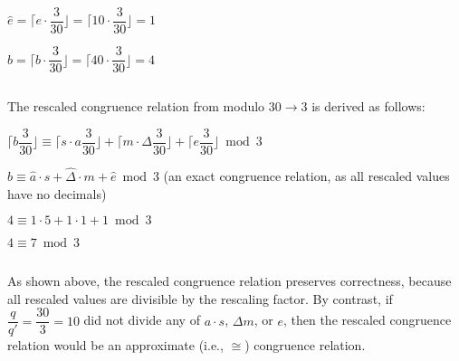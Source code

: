 $\hat{e} = \Bigg\lceil e\cdot\dfrac{3}{30} \Bigg\rfloor = \Bigg\lceil 10\cdot\dfrac{3}{30} \Bigg\rfloor = 1$

$\hat{b} = \Bigg\lceil b\cdot\dfrac{3}{30} \Bigg\rfloor = \Bigg\lceil 40\cdot\dfrac{3}{30} \Bigg\rfloor = 4$

$ $

The rescaled congruence relation from modulo $30 \rightarrow 3$ is derived as follows:

$\Bigg\lceil b\dfrac{3}{30} \Bigg\rfloor \equiv \Bigg\lceil s\cdot a \dfrac{3}{30} \Bigg\rfloor + \Bigg\lceil m \cdot \Delta \dfrac{3}{30} \Bigg\rfloor + \Bigg\lceil e \dfrac{3}{30} \Bigg\rfloor \bmod 3$

$\hat{b} \equiv \hat{a} \cdot s + \hat{\Delta} \cdot m + \hat{e}  \bmod 3$
 \text{ } (an exact congruence relation, as all rescaled values have no decimals)

$4 \equiv 1 \cdot 5 + 1 \cdot 1 + 1 \bmod 3$

$4 \equiv 7 \bmod 3$

$ $

As shown above, the rescaled congruence relation preserves correctness, because all rescaled values are divisible by the rescaling factor. By contrast, if $\dfrac{q}{q'} = \dfrac{30}{3} = 10$ did not divide any of $a\cdot s$, $\Delta m$, or $e$, then the rescaled congruence relation would be an approximate (i.e., $\cong$) congruence relation. 






